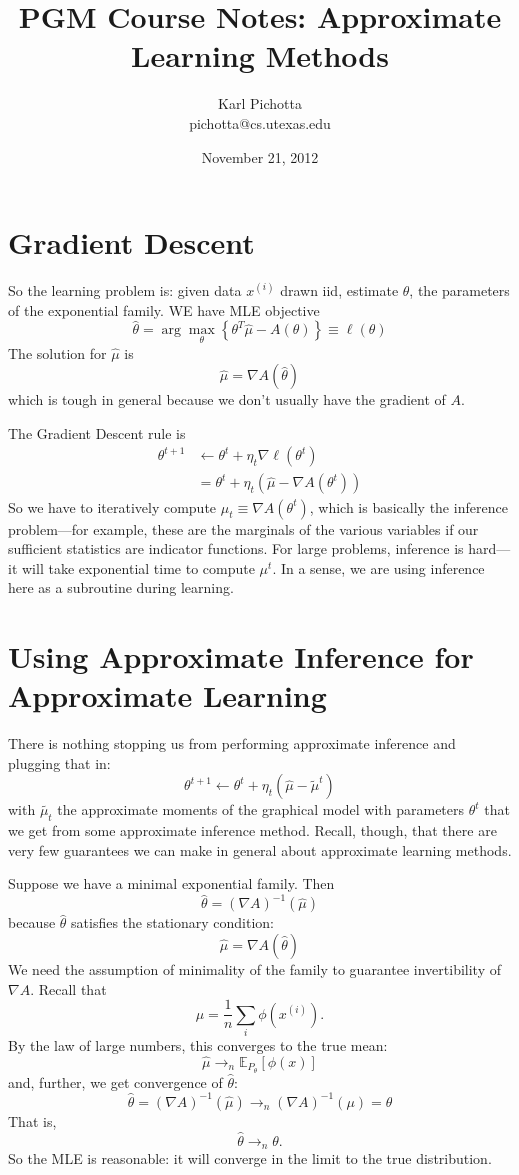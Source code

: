 \documentclass{article}
\title{PGM Course Notes: Approximate Learning Methods}
\author{Karl Pichotta \\ pichotta@cs.utexas.edu}
\date{November 21, 2012}
\newcommand{\E}{\mathbb{E}}
\newcommand{\inv}{^{-1}}
\begin{document}
\maketitle




\section{Gradient Descent}

So the learning problem is: given data $x^{(i)}$ drawn iid, estimate $\theta$, the parameters of the exponential family.
WE have MLE objective
$$
\hat\theta = \arg\max_\theta \left\{
\theta^T \hat\mu - A(\theta)
\right\}
\equiv \ell(\theta)
$$
The solution for $\hat\mu$ is
$$
\hat\mu = \nabla A(\hat\theta)
$$
which is tough in general because we don't usually have the gradient of $A$.

The Gradient Descent rule is
\begin{align}
\theta^{t+1}
&\leftarrow
\theta^t + \eta_t \nabla \ell(\theta^t)
\\
&=
\theta^t + \eta_t (\hat\mu - \nabla A(\theta^t))
\end{align}
So we have to iteratively compute $\mu_t \equiv \nabla A(\theta^t)$, which is basically the inference problem---for example, these are the marginals of the various variables if our sufficient statistics are indicator functions.
For large problems, inference is hard---it will take exponential time to compute $\mu^t$.
In a sense, we are using inference here as a subroutine during learning.

\section{Using Approximate Inference for Approximate Learning}

There is nothing stopping us from performing approximate inference and plugging that in:
$$
\theta^{t+1} \leftarrow
\theta^t + \eta_t(\hat\mu - \tilde \mu^t)
$$
with $\tilde{\mu_t}$ the approximate moments of the graphical model with parameters $\theta^t$ that we get from some approximate inference method.
Recall, though, that there are very few guarantees we can make in general about approximate learning methods.

Suppose we have a minimal exponential family.
Then
$$
\hat\theta = (\nabla A)\inv(\hat\mu)
$$
because $\hat\theta$ satisfies the stationary condition:
$$
\hat\mu = \nabla A(\hat\theta)
$$
We need the assumption of minimality of the family to guarantee invertibility of $\nabla A$.
Recall that
$$
\hat\mu = \frac{1}{n} \sum_i \phi(x^{(i)}).
$$
By the law of large numbers, this converges to the true mean:
$$
\hat\mu \rightarrow_{n} \E_{P_\theta}[\phi(x)]
$$
and, further, we get convergence of $\hat\theta$:
$$
\hat\theta = (\nabla A)\inv (\hat\mu) \rightarrow_n
(\nabla A)\inv (\mu) = \theta
$$
That is,
$$
\hat\theta \rightarrow_n \theta.
$$
So the MLE is reasonable: it will converge in the limit to the true distribution.
\end{document}
